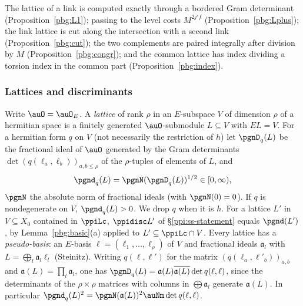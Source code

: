 \documentclass[10pt]{amsart}
\theoremstyle{definition}
\theoremstyle{remark}
\providecommand{\aubar}[1]{\overline{#1}}
\begin{document}
The lattice of a link is computed exactly through a bordered
Gram determinant (Proposition~\ref{pbg:L1}); passing to the level costs $M^{2j'f}$
(Proposition~\ref{pbg:Lplus}); the link lattice is cut along the intersection with a second link
(Proposition~\ref{pbg:cut}); the two complements are paired integrally after division by $M$
(Proposition~\ref{pbg:congr}); and the common lattice has index dividing a torsion index in the
common part (Proposition~\ref{pbg:index}).

\subsubsection{Lattices and discriminants}\label{pbg:ss-lattices}

Write $\auO=\auO_E$. A \emph{lattice} of rank $\rho$ in an $E$-subspace $V$ of dimension $\rho$ of a
hermitian space is a finitely generated $\auO$-submodule $L\subseteq V$ with $EL=V$. For a hermitian
form $q$ on $V$ (not necessarily the restriction of $h$) let $\pgnD_q(L)$ be the fractional ideal of
$\auO$ generated by the Gram determinants $\det(q(\ell_a,\ell_b))_{a,b\le\rho}$ of the
$\rho$-tuples of elements of $L$, and
\[
\pgnd_q(L)=\pgnN(\pgnD_q(L))^{1/2}\in[0,\infty),
\]
$\pgnN$ the absolute norm of fractional ideals (with $\pgnN(0)=0$). If $q$ is nondegenerate on $V$,
$\pgnd_q(L)>0$. We drop $q$ when it is $h$. For a lattice $L'$ in $V\subseteq X_0$ contained in
$\ppiLc$, $\ppidisc L'$ of \S\ref{ppi:ss-statement} equals $\pgnd(L')$, by Lemma~\ref{pbg:basic}(a)
applied to $L'\subseteq\ppiLc\cap V$. Every lattice has a \emph{pseudo-basis}: an $E$-basis $\ell=
(\ell_1,\dots,\ell_\rho)$ of $V$ and fractional ideals $\mathfrak a_l$ with $L=\bigoplus_l\mathfrak a_l
\ell_l$ (Steinitz). Writing $q(\ell,\ell')$ for the matrix $(q(\ell_a,\ell'_b))_{a,b}$ and $\mathfrak a(L)=
\prod_l\mathfrak a_l$, one has $\pgnD_q(L)=\mathfrak a(L)\aubar{\mathfrak a(L)}\det q(\ell,\ell)$, since
the determinants of the $\rho\times\rho$ matrices with columns in $\bigoplus\mathfrak a_l$ generate
$\mathfrak a(L)$. In particular $\pgnd_q(L)^2=\pgnN(\mathfrak a(L))^2\auNm\det q(\ell,\ell)$.
\end{document}
